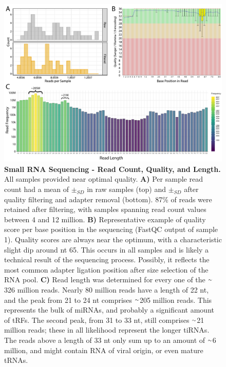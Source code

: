 \begin{figure}[ht]
\centering
\includegraphics[width=\textwidth]{figures/read-quality-length}
\caption[Small RNA Sequencing - Read Count, Quality, and Length.]{\textbf{Small RNA Sequencing - Read Count, Quality, and Length.} All samples provided near optimal quality. \textbf{A)} Per sample read count had a mean of  $\pm_{SD}$  in raw samples (top) and  $\pm_{SD}$  after quality filtering and adapter removal (bottom). 87\% of reads were retained after filtering, with samples spanning read count values between 4 and 12 million. \textbf{B)} Representative example of quality score per base position in the sequencing (FastQC output of sample \num{1}). Quality scores are always near the optimum, with a characteristic slight dip around nt 65. This occurs in all samples and is likely a technical result of the sequencing process. Possibly, it reflects the most common adapter ligation position after size selection of the RNA pool. \textbf{C)} Read length was determined for every one of the $\smallsim$326 million reads. Nearly 80 million reads have a length of 22 nt, and the peak from 21 to 24 nt comprises $\smallsim$205 million reads. This represents the bulk of miRNAs, and probably a significant amount of tRFs. The second peak, from 31 to 33 nt, still comprises $\smallsim$21 million reads; these in all likelihood represent the longer tiRNAs. The reads above a length of 33 nt only sum up to an amount of $\smallsim$6 million, and might contain RNA of viral origin, or even mature tRNAs.
\label{fig:read-quality-length}}
\end{figure}

